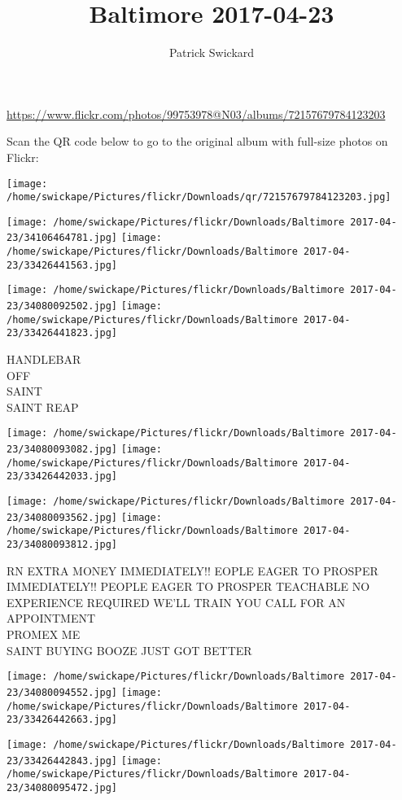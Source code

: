 \documentclass[10pt,letterpaper]{article}
\title{Baltimore 2017-04-23}
\author{Patrick Swickard}
\date{}
\begin{document}
\maketitle

\url{https://www.flickr.com/photos/99753978@N03/albums/72157679784123203}

Scan the QR code below to go to the original album with full-size photos on Flickr:

\texttt{[image: /home/swickape/Pictures/flickr/Downloads/qr/72157679784123203.jpg]}
\pagebreak

\texttt{[image: /home/swickape/Pictures/flickr/Downloads/Baltimore 2017-04-23/34106464781.jpg]}
\texttt{[image: /home/swickape/Pictures/flickr/Downloads/Baltimore 2017-04-23/33426441563.jpg]}

\texttt{[image: /home/swickape/Pictures/flickr/Downloads/Baltimore 2017-04-23/34080092502.jpg]}
\texttt{[image: /home/swickape/Pictures/flickr/Downloads/Baltimore 2017-04-23/33426441823.jpg]}

HANDLEBAR\\
OFF\\
SAINT\\
SAINT REAP
\pagebreak

\texttt{[image: /home/swickape/Pictures/flickr/Downloads/Baltimore 2017-04-23/34080093082.jpg]}
\texttt{[image: /home/swickape/Pictures/flickr/Downloads/Baltimore 2017-04-23/33426442033.jpg]}

\texttt{[image: /home/swickape/Pictures/flickr/Downloads/Baltimore 2017-04-23/34080093562.jpg]}
\texttt{[image: /home/swickape/Pictures/flickr/Downloads/Baltimore 2017-04-23/34080093812.jpg]}

RN EXTRA MONEY IMMEDIATELY!! EOPLE EAGER TO PROSPER\\
IMMEDIATELY!!  PEOPLE EAGER TO PROSPER TEACHABLE NO EXPERIENCE REQUIRED WE'LL TRAIN YOU CALL FOR AN APPOINTMENT\\
PROMEX ME\\
SAINT BUYING BOOZE JUST GOT BETTER
\pagebreak

\texttt{[image: /home/swickape/Pictures/flickr/Downloads/Baltimore 2017-04-23/34080094552.jpg]}
\texttt{[image: /home/swickape/Pictures/flickr/Downloads/Baltimore 2017-04-23/33426442663.jpg]}

\texttt{[image: /home/swickape/Pictures/flickr/Downloads/Baltimore 2017-04-23/33426442843.jpg]}
\texttt{[image: /home/swickape/Pictures/flickr/Downloads/Baltimore 2017-04-23/34080095472.jpg]}
\end{document}
